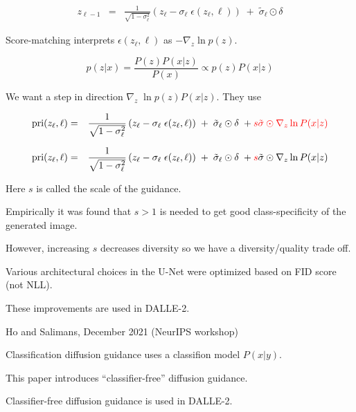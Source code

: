 {{\huge
\begin{eqnarray*}
  z_{\ell-1} & = & \frac{1}{\sqrt{1-\sigma_\ell^2}}\left(z_\ell - \sigma_\ell\; \epsilon(z_\ell,\ell)\right)\; +\; \tilde{\sigma}_\ell\odot\delta
\end{eqnarray*}
}

\vfill
Score-matching interprets $\epsilon(z_\ell,\ell)$ as $- \nabla_z \ln p(z)$.

\vfill
$$p(z|x) = \frac{P(z)P(x|z)}{P(x)} \propto p(z)P(x|z)$$

\vfill
We want a step in direction $\nabla_z\;\ln p(z)P(x|z)$. They use

{\huge
\begin{eqnarray*}
  \mathrm{pri}(z_\ell,\ell) & = & \frac{1}{\sqrt{1-\sigma_\ell^2}}\left(z_\ell - \sigma_\ell\; \epsilon(z_\ell,\ell)\right) \; +\; \tilde{\sigma}_\ell\odot\delta\; + {\color{red} s\tilde{\sigma}\odot\nabla_{z} \ln P(x|z)}
\end{eqnarray*}
}


{\huge
\begin{eqnarray*}
  \mathrm{pri}(z_\ell,\ell) & = & \frac{1}{\sqrt{1-\sigma_\ell^2}}\left(z_\ell - \sigma_\ell\; \epsilon(z_\ell,\ell)\right) \; +\; \tilde{\sigma}_\ell\odot\delta\; + {\color{red} s}\tilde{\sigma}\odot\nabla_{z} \ln P(x|z)
\end{eqnarray*}
}

Here $s$ is called the scale of the guidance.

\vfill
Empirically it was found that $s > 1$ is needed to get good class-specificity of the generated image.

\vfill
However, increasing $s$ decreases diversity so we have a diversity/quality trade off.


Various architectural choices in the U-Net were optimized based on FID score (not NLL).

\vfill
These improvements are used in DALLE-2.


{Ho and Salimans, December 2021 (NeurIPS workshop)}

Classification diffusion guidance uses a classifion model $P(x|y)$.

\vfill
This paper introduces ``classifier-free'' diffusion guidance.

\vfill
Classifier-free diffusion guidance is used in DALLE-2.


}
